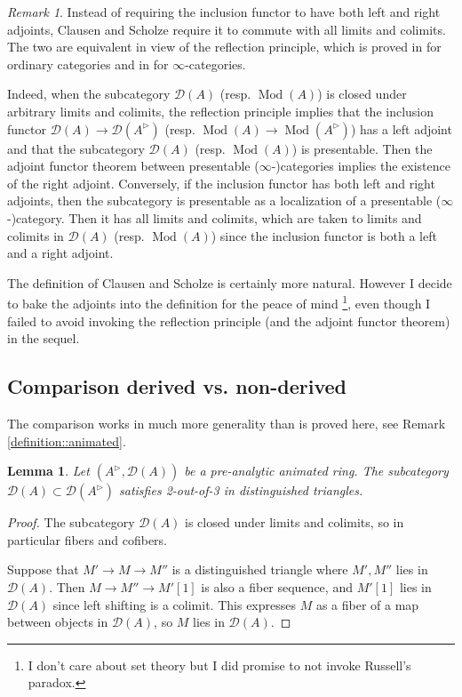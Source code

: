 \documentclass{article}
\theoremstyle{plain}
\newtheorem{lem}[thm]{Lemma}
\theoremstyle{definition}
\theoremstyle{remark}
\newtheorem{rmk}[thm]{Remark}
\DeclareMathOperator{\modcat}{Mod}
\newcommand{\huflag}{\triangleright}
\newcommand{\D}{\mathcal{D}}
\newcommand{\bullshit}[1]{\footnote{#1}}
\newcommand{\resp}[1]{{\color{respcolor}(resp. #1)}}
\begin{document}
\begin{rmk}
\label{definition::nonsense}
Instead of requiring the inclusion functor to have both left and right adjoints,
Clausen and Scholze require it to commute with all limits and colimits.
The two are equivalent in view of the reflection principle,
which is proved in \cite{adamek_reflections_1989} for ordinary categories and in \cite{ragimov_infty-categorical_2022} for $ \infty $-categories.

Indeed, when the subcategory $ \D (A) $ (resp. $ \modcat (A) $) is closed under arbitrary limits and colimits,
the reflection principle implies that the inclusion functor $ \D (A)\to \D (A ^{\huflag}) $ \resp{$ \modcat (A)\to \modcat (A ^{\huflag}) $}
has a left adjoint and that the subcategory
$ \D (A) $ \resp{$ \modcat (A) $} is presentable.
Then the adjoint functor theorem between presentable ($ \infty $-)categories implies the existence of the right adjoint.
Conversely, if the inclusion functor has both left and right adjoints, then the subcategory is presentable as
a localization of a presentable ($ \infty $-)category. Then it has all limits and colimits,
which are taken to limits and colimits in $ \D (A) $ (resp. $ \modcat (A) $) since the inclusion functor
is both a left and a right adjoint.

The definition of Clausen and Scholze is certainly more natural.
However I decide to bake the adjoints into the definition for the peace of mind
\bullshit{I don't care about set theory but I did promise to not invoke Russell's paradox.},
even though I failed to avoid invoking the reflection principle (and the adjoint functor theorem) in the sequel.
\end{rmk}

\subsection{Comparison derived vs. non-derived}
The comparison works in much more generality than is proved here, see Remark \ref{definition::animated}.

\begin{lem}
Let $ (A ^{\huflag}, \D (A)) $ be a pre-analytic animated ring.
The subcategory $ \D (A)\subset \D (A ^{\huflag}) $ satisfies 2-out-of-3 in distinguished triangles.
\end{lem}

\begin{proof}
The subcategory $ \D (A) $ is closed under limits and colimits, so in particular fibers and cofibers.

Suppose that $ M'\to M\to M'' $ is a distinguished triangle where $ M',M'' $ lies in $ \D (A) $.
Then $ M\to M''\to M'[1] $ is also a fiber sequence, and $ M' [1] $ lies in $ \D (A) $ since left shifting is a colimit.
This expresses $ M $ as a fiber of a map between objects in $ \D (A) $, so $ M $ lies in $ \D (A) $.
\end{proof}
\end{document}
